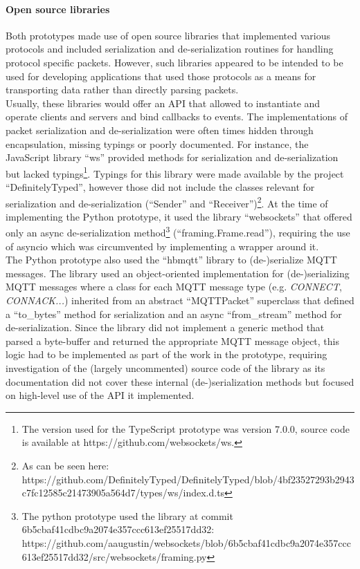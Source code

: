 \paragraph{Open source libraries} Both prototypes made use of open source libraries that implemented various protocols and included serialization and de-serialization routines for handling protocol specific packets. However, such libraries appeared to be intended to be used for developing applications that used those protocols as a means for transporting data rather than directly parsing packets.\\
Usually, these libraries would offer an API that allowed to instantiate and operate clients and servers and bind callbacks to events. The implementations of packet serialization and de-serialization were often times hidden through encapsulation, missing typings or poorly documented. For instance, the JavaScript library \enquote{ws} provided methods for serialization and de-serialization but lacked typings\footnote{The version used for the TypeScript prototype was version 7.0.0, source code is available at https://github.com/websockets/ws.}. Typings for this library were made available by the project \enquote{DefinitelyTyped}, however those did not include the classes relevant for serialization and de-serialization (\enquote{Sender} and \enquote{Receiver})\footnote{As can be seen here: https://github.com/DefinitelyTyped/DefinitelyTyped/blob/4bf23527293b2943c7fc12585c21473905a564d7/types/ws/index.d.ts}. At the time of implementing the Python prototype, it used the library \enquote{websockets} that offered only an async de-serialization method\footnote{The python prototype used the library at commit 6b5cbaf41cdbc9a2074e357ccc613ef25517dd32: https://github.com/aaugustin/websockets/blob/6b5cbaf41cdbc9a2074e357ccc613ef25517dd32/src/websockets/framing.py} (\enquote{framing.Frame.read}), requiring the use of asyncio which was circumvented by implementing a wrapper around it.\\
The Python prototype also used the \enquote{hbmqtt} library to (de-)serialize \ac{MQTT} messages. The library used an object-oriented implementation for (de-)serializing \ac{MQTT} messages where a class for each \ac{MQTT} message type (e.g. \emph{CONNECT}, \emph{CONNACK...}) inherited from an abstract \enquote{MQTTPacket} superclass %
that defined a \enquote{to\_bytes} method for serialization and an async \enquote{from\_stream} method for de-serialization. Since the library did not implement a generic method that parsed a byte-buffer and returned the appropriate \ac{MQTT} message object, this logic had to be implemented as part of the work in the prototype, requiring investigation of the (largely uncommented) source code of the library as its documentation did not cover these internal (de-)serialization methods but focused on high-level use of the API it implemented.\\

